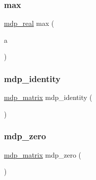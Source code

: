\subsubsection{\texorpdfstring{max}{max}}
{\footnotesize\ttfamily \hyperlink{mdp__global__vars_8h_a69d96b74c791e0bbdb888b3913a69450}{mdp\+\_\+real} max (\begin{DoxyParamCaption}\item[{const \hyperlink{classmdp__matrix}{mdp\+\_\+matrix} \&}]{a }\end{DoxyParamCaption})\hspace{0.3cm}{\ttfamily [friend]}}

\mbox{\label{classmdp__matrix_a6b60fadcf53631a262b63ffb5f0f56ea}} 
\subsubsection{\texorpdfstring{mdp\+\_\+identity}{mdp\_identity}}
{\footnotesize\ttfamily \hyperlink{classmdp__matrix}{mdp\+\_\+matrix} mdp\+\_\+identity (\begin{DoxyParamCaption}{ }\end{DoxyParamCaption})\hspace{0.3cm}{\ttfamily [friend]}}

\mbox{\label{classmdp__matrix_a1ba8b1ac1136a436607d0f7815868508}} 
\subsubsection{\texorpdfstring{mdp\+\_\+zero}{mdp\_zero}}
{\footnotesize\ttfamily \hyperlink{classmdp__matrix}{mdp\+\_\+matrix} mdp\+\_\+zero (\begin{DoxyParamCaption}{ }\end{DoxyParamCaption})\hspace{0.3cm}{\ttfamily [friend]}}

\mbox{\label{classmdp__matrix_acf7cf6445d6a42f2aa791bc1088a816f}} 
